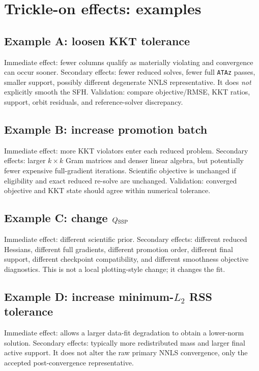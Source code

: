 \documentclass[10pt,a4paper]{article}
\newcommand{\code}[1]{\texttt{#1}}
\begin{document}
\section{Trickle-on effects: examples}
\subsection{Example A: loosen KKT tolerance}
Immediate effect: fewer columns qualify as materially violating and convergence can occur sooner. Secondary effects: fewer reduced solves, fewer full \code{ATAz} passes, smaller support, possibly different degenerate NNLS representative. It does \emph{not} explicitly smooth the SFH. Validation: compare objective/RMSE, KKT ratios, support, orbit residuals, and reference-solver discrepancy.

\subsection{Example B: increase promotion batch}
Immediate effect: more KKT violators enter each reduced problem. Secondary effects: larger $k\times k$ Gram matrices and denser linear algebra, but potentially fewer expensive full-gradient iterations. Scientific objective is unchanged if eligibility and exact reduced re-solve are unchanged. Validation: converged objective and KKT state should agree within numerical tolerance.

\subsection{Example C: change \texorpdfstring{$Q_{\rm SSP}$}{Q SSP}}
Immediate effect: different scientific prior. Secondary effects: different reduced Hessians, different full gradients, different promotion order, different final support, different checkpoint compatibility, and different smoothness objective diagnostics. This is not a local plotting-style change; it changes the fit.

\subsection{Example D: increase minimum-\texorpdfstring{$L_2$}{L2} RSS tolerance}
Immediate effect: allows a larger data-fit degradation to obtain a lower-norm solution. Secondary effects: typically more redistributed mass and larger final active support. It does not alter the raw primary NNLS convergence, only the accepted post-convergence representative.
\end{document}
